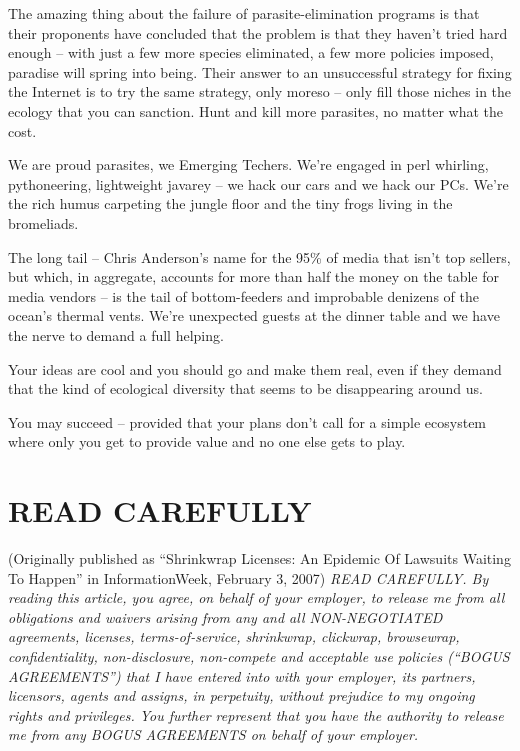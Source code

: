 The amazing thing about the failure of parasite-elimination
programs is that their proponents have concluded that the problem
is that they haven't tried hard enough -- with just a few more
species eliminated, a few more policies imposed, paradise will
spring into being. Their answer to an unsuccessful strategy for
fixing the Internet is to try the same strategy, only moreso --
only fill those niches in the ecology that you can sanction. Hunt
and kill more parasites, no matter what the cost.

We are proud parasites, we Emerging Techers. We're engaged in perl
whirling, pythoneering, lightweight javarey -- we hack our cars and
we hack our PCs. We're the rich humus carpeting the jungle floor
and the tiny frogs living in the bromeliads.

The long tail -- Chris Anderson's name for the 95\% of media that
isn't top sellers, but which, in aggregate, accounts for more than
half the money on the table for media vendors -- is the tail of
bottom-feeders and improbable denizens of the ocean's thermal
vents. We're unexpected guests at the dinner table and we have the
nerve to demand a full helping.

Your ideas are cool and you should go and make them real, even if
they demand that the kind of ecological diversity that seems to be
disappearing around us.

You may succeed -- provided that your plans don't call for a simple
ecosystem where only you get to provide value and no one else gets
to play.

\section{READ CAREFULLY}

(Originally published as ``Shrinkwrap Licenses: An Epidemic Of
Lawsuits Waiting To Happen'' in InformationWeek, February 3, 2007)
\emph{READ CAREFULLY. By reading this article, you agree, on behalf of your employer, to release me from all obligations and waivers arising from any and all NON-NEGOTIATED agreements, licenses, terms-of-service, shrinkwrap, clickwrap, browsewrap, confidentiality, non-disclosure, non-compete and acceptable use policies (``BOGUS AGREEMENTS'') that I have entered into with your employer, its partners, licensors, agents and assigns, in perpetuity, without prejudice to my ongoing rights and privileges. You further represent that you have the authority to release me from any BOGUS AGREEMENTS on behalf of your employer.}

